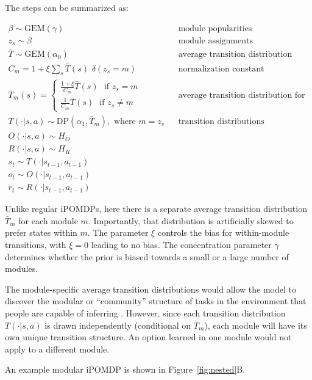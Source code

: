 \documentclass[11pt]{article}
\begin{document}
The steps can be summarized as:

\begin{align*}
\beta \sim \text{GEM}(\gamma)   		&& \text{module popularities} \\
z_s \sim \beta   		&& \text{module assignments} \\
\bar{T} \sim \text{GEM}(\alpha_0)     		&& \text{average transition distribution} \\
C_m =  1 + \xi {\sum_s \bar{T}(s) \,\, \delta(z_s = m) }   		&& \text{normalization constant} \\
\bar{T}_m(s) = \begin{cases} \frac{1 + \xi}{C_m} \bar{T}(s)  \,\, \text{ if }  z_s = m \\  \frac{1}{C_m} \bar{T}(s) \,\, \text{ if } z_s \ne m \end{cases}     		&& \text{average transition distribution for each module} \\ 
T(\cdot | s,a) \sim \text{DP}(\alpha_1, \bar{T}_m), \text{ where } m = z_s 		 && \text{transition distributions}\\
O(\cdot | s,a) \sim H_O \\
R(\cdot | s,a) \sim H_R \\
s_t \sim T(\cdot | s_{t-1},a_{t-1}) \\
o_t \sim O(\cdot | s_{t-1}, a_{t-1}) \\
r_t \sim R(\cdot | s_{t-1}, a_{t-1}) 
\end{align*}

Unlike regular iPOMDPs, here there is a separate average transition distribution $\bar{T}_m$ for each module $m$. Importantly, that distribution is artificially skewed to prefer states within $m$. The parameter $\xi$ controls the bias for within-module transitions, with $\xi = 0$ leading to no bias. The concentration parameter $\gamma$ determines whether the prior is biased towards a small or a large number of modules.

The module-specific average transition distributions would allow the model to discover the modular or ``community'' structure of tasks in the environment that people are capable of inferring \cite{Schapiro2013, Solway2014}. However, since each transition distribution $T(\cdot|s,a)$ is drawn independently (conditional on $\bar{T}_m$), each module will have its own unique transition structure. An option learned in one module would not apply to a different module.

An example modular iPOMDP is shown in Figure~\ref{fig:nested}B.
\end{document}
